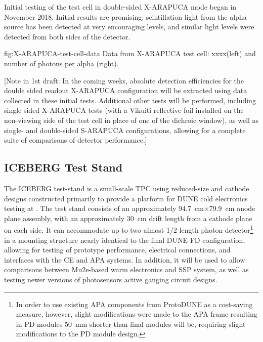 Initial testing of the test cell in double-sided X-ARAPUCA mode began in November 2018.  Initial results are promising:  scintillation light from the alpha source has been detected at very encouraging levels, and similar light levels were detected from both sides of the detector.


\begin{dunefigure}{fig:X-ARAPUCA-test-cell-data}
{Data from X-ARAPUCA test cell: xxxx(left) and number of photons per alpha (right).} 
\end{dunefigure}


[Note in 1st draft:  In the coming weeks, absolute detection efficiencies for the double sided readout X-ARAPUCA configuration will be extracted using data collected in these initial tests.  Additional other tests will be performed, including single sided X-ARAPUCA tests (with a Vikuiti reflective foil installed on the non-viewing side of the test cell in place of one of the dichroic window), as well as single- and double-sided S-ARAPUCA configurations, allowing for a complete suite of comparisons of detector performance.]



% 

\subsection{ICEBERG Test Stand}
\label{sec:iceberg-teststand}

The ICEBERG test-stand is a small-scale TPC using reduced-size   and cathode designs constructed primarily to provide a platform for DUNE cold electronics testing at . 
The test stand consists of an approximately \SI{94.7}{cm}$\times$\SI{79.9}{cm} anode plane assembly, with an approximately \SI{30}{cm} drift length from a cathode plane on each side.  
It can accommodate up to two almost 1/2-length photon-detector\footnote{In order to use existing APA components from ProtoDUNE as a cost-saving measure, however, slight modifications were made to the APA frame resulting in PD modules \SI{50}{mm} shorter than final modules will be, requiring slight modifications to the PD module design.} in a mounting structure nearly identical to the final DUNE FD configuration, allowing for testing of  prototype performance, electrical connections, and interfaces with the CE and APA systems. 
In addition, it will be used to allow comparisons between Mu2e-based warm electronics and  SSP system, as well as testing newer versions of photosensors active ganging circuit designs.

